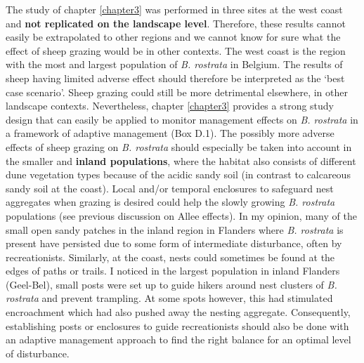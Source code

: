 \documentclass[10pt, twoside]{book} %
\begin{document}
	\enlargethispage{1\baselineskip}
	The study of chapter \ref{chapter3} was performed in three sites at the west coast and \textbf{not replicated on the landscape level}. Therefore, these results cannot easily be extrapolated to other regions and we cannot know for sure what the effect of sheep grazing would be in other contexts. The west coast is the region with the most and largest population of \textit{B. rostrata} in Belgium. The results of sheep having limited adverse effect should therefore be interpreted as the `best case scenario'. Sheep grazing could still be more detrimental elsewhere, in other landscape contexts. Nevertheless, chapter \ref{chapter3} provides a strong study design that can easily be applied to monitor management effects on \textit{B. rostrata} in a framework of adaptive management (Box D.1). The possibly more adverse effects of sheep grazing on \textit{B. rostrata} should especially be taken into account in the smaller and \textbf{inland populations}, where the habitat also consists of different dune vegetation types because of the acidic sandy soil (in contrast to calcareous sandy soil at the coast). Local and/or temporal enclosures to safeguard nest aggregates when grazing is desired could help the slowly growing \textit{B. rostrata} populations (see previous discussion on Allee effects). In my opinion, many of the small open sandy patches in the inland region in Flanders where \textit{B. rostrata} is present have persisted due to some form of intermediate disturbance, often by recreationists. Similarly, at the coast, nests could sometimes be found at the edges of paths or trails. I noticed in the largest population in inland Flanders (Geel-Bel), small posts were set up to guide hikers around nest clusters of \textit{B. rostrata} and prevent trampling. At some spots however, this had stimulated encroachment which had also pushed away the nesting aggregate. Consequently, establishing posts or enclosures to guide recreationists should also be done with an adaptive management approach to find the right balance for an optimal level of disturbance.\clearpage
	
\end{document}
